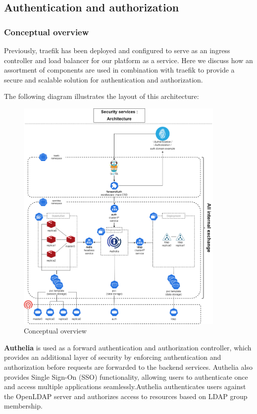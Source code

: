 \newpage

\subsection{Authentication and authorization}
\subsubsection{Conceptual overview }

Previously, traefik has been deployed and configured to serve as an ingress controller and load balancer for our platform as a service. Here we discuss how an assortment of components are used in combination with traefik to provide a secure and scalable solution for authentication and authorization. 

The following diagram illustrates the layout of this architecture: 

\begin{figure}[H]\centering
\includegraphics[width=0.9\textwidth,angle=00]{assets/f51.png}
\caption{Conceptual overview }
\label{fig:f51}
\end{figure} 

\newpage

\textbf{Authelia} is used as a forward authentication and authorization controller, which provides an additional layer of security by enforcing authentication and authorization before requests are forwarded to the backend services. Authelia also provides Single Sign-On (SSO) functionality, allowing users to authenticate once and access multiple applications seamlessly.Authelia authenticates users against the OpenLDAP server and authorizes access to resources based on LDAP group membership.  

